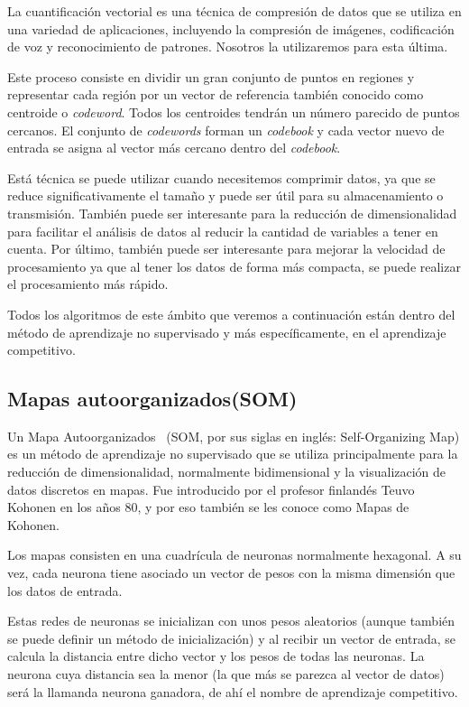 La cuantificación vectorial es una técnica de compresión de datos que se utiliza en una variedad de aplicaciones, incluyendo la compresión de imágenes, codificación de voz y reconocimiento de patrones. Nosotros la utilizaremos para esta última.

Este proceso consiste en dividir un gran conjunto de puntos en regiones y representar cada región por un vector de referencia también conocido como centroide o \emph{codeword}. Todos los centroides tendrán un número parecido de puntos cercanos. El conjunto de \emph{codewords} forman un \emph{codebook} y cada vector nuevo de entrada se asigna al vector más cercano dentro del \emph{codebook}.

Está técnica se puede utilizar cuando necesitemos comprimir datos, ya que se reduce significativamente el tamaño y puede ser útil para su almacenamiento o transmisión. También puede ser interesante para la reducción de dimensionalidad para facilitar el análisis de datos al reducir la cantidad de variables a tener en cuenta. Por último, también puede ser interesante para mejorar la velocidad de procesamiento ya que al tener los datos de forma más compacta, se puede realizar el procesamiento más rápido.

Todos los algoritmos de este ámbito que veremos a continuación están dentro del método de aprendizaje no supervisado y más específicamente, en el aprendizaje competitivo.

\subsection{Mapas autoorganizados(SOM)}

Un Mapa Autoorganizados~\cite{halweb:SOM} (SOM, por sus siglas en inglés: Self-Organizing Map) es un método de aprendizaje no supervisado que se utiliza principalmente para la reducción de dimensionalidad, normalmente bidimensional y la visualización de datos discretos en mapas. Fue introducido por el profesor finlandés Teuvo Kohonen en los años 80, y por eso también se les conoce como Mapas de Kohonen.


Los mapas consisten en una cuadrícula de neuronas normalmente hexagonal. A su vez, cada neurona tiene asociado un vector de pesos con la misma dimensión que los datos de entrada.

Estas redes de neuronas se inicializan con unos pesos aleatorios (aunque también se puede definir un método de inicialización) y al recibir un vector de entrada, se calcula la distancia entre dicho vector y los pesos de todas las neuronas. La neurona cuya distancia sea la menor (la que más se parezca al vector de datos) será la llamanda neurona ganadora, de ahí el nombre de aprendizaje competitivo.

